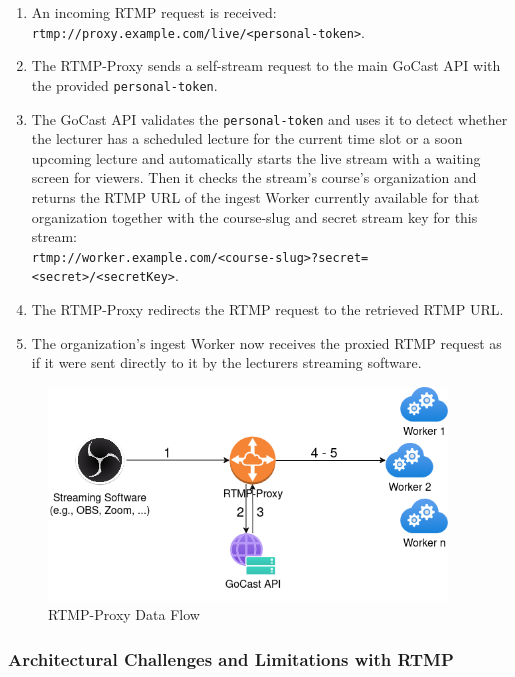 \begin{enumerate}
    \item An incoming \ac{RTMP} request is received:\\
    \texttt{rtmp://proxy.example.com/live/<personal-token>}.
    \item The RTMP-Proxy sends a self-stream request to the main GoCast \ac{API} with the provided \texttt{personal-token}.
    \item The GoCast \ac{API} validates the \texttt{personal-token} and uses it to detect whether the lecturer has a scheduled lecture for the current time slot or a soon upcoming lecture and automatically starts the live stream with a waiting screen for viewers. Then it checks the stream's course's organization and returns the \ac{RTMP} URL of the ingest Worker currently available for that organization together with the course-slug and secret stream key for this stream: \\ 
    \texttt{rtmp://worker.example.com/<course-slug>?secret=<secret>/<secretKey>}.
    \item The RTMP-Proxy redirects the \ac{RTMP} request to the retrieved \ac{RTMP} URL.
    \item The organization's ingest Worker now receives the proxied \ac{RTMP} request as if it were sent directly to it by the lecturers streaming software.
\end{enumerate}

\begin{figure}[htpb]
    \centering
    \includegraphics[width=300pt]{images/RtmpProxy.png}
    \caption[RTMP-Proxy Flow]{RTMP-Proxy Data Flow}\label{fig:rtmp-proxy}
\end{figure}

\subsubsection{Architectural Challenges and Limitations with RTMP}

